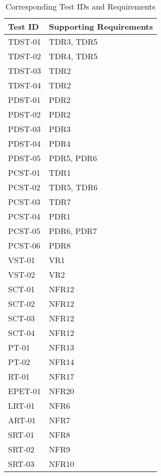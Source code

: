 \documentclass[12pt, titlepage]{article}
\begin{document}
\begin{longtable}{ |p{4cm}|p{8cm}|  }
  \caption{Corresponding Test IDs and Requirements}
  \label{tab:Table1}\\
  
  \hline
  \textbf{Test ID} & \textbf{Supporting Requirements}\\
  \hline
  TDST-01 &  TDR3, TDR5\\
  \hline
  TDST-02 &  TDR4, TDR5 \\
  \hline
  TDST-03 &  TDR2 \\
  \hline
  TDST-04 &  TDR2 \\
  \hline
  PDST-01 &  PDR2 \\
  \hline
  PDST-02 &  PDR2 \\
  \hline
  PDST-03 &  PDR3 \\
  \hline
  PDST-04 &  PDR4 \\
  \hline
  PDST-05 &  PDR5, PDR6 \\
  \hline
  PCST-01 &  TDR1 \\
  \hline
  PCST-02 &  TDR5, TDR6 \\
  \hline
  PCST-03 &  TDR7 \\
  \hline
  PCST-04 &  PDR1 \\
  \hline
  PCST-05 &  PDR6, PDR7 \\
  \hline
  PCST-06 &  PDR8 \\
  \hline
  VST-01 &  VR1 \\
  \hline
  VST-02&  VR2 \\
  \hline
  SCT-01 &  NFR12 \\
  \hline
  SCT-02 &  NFR12 \\
  \hline
  SCT-03 &  NFR12 \\
  \hline
  SCT-04 &  NFR12 \\
  \hline
  PT-01 & NFR13 \\
  \hline
  PT-02 & NFR14 \\
  \hline
  RT-01 & NFR17 \\
  \hline
  EPET-01 & NFR20 \\
  \hline
  LRT-01&  NFR6 \\
  \hline
  ART-01 & NFR7 \\
  \hline
  SRT-01 & NFR8 \\
  \hline
  SRT-02 & NFR9 \\
  \hline
  SRT-03 & NFR10 \\
  \hline
\end{longtable}

\newpage
\end{document}
